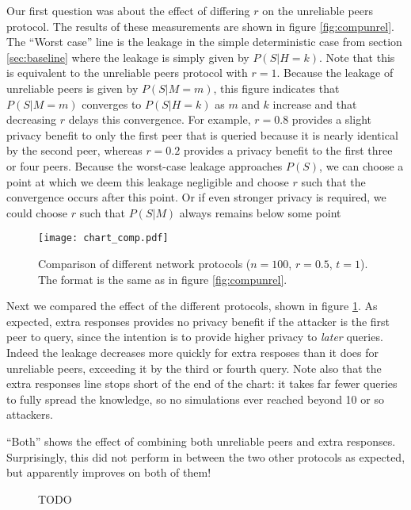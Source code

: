 \documentclass{article}
\newcommand{\secref}[1]{section \ref{sec:#1}}
\newcommand{\figref}[1]{figure \ref{fig:#1}}
\begin{document}
Our first question was about the effect of differing $r$ on the unreliable peers
protocol. The results of these measurements are shown in \figref{compunrel}.
The ``Worst case'' line is the leakage in the simple deterministic case from
\secref{baseline} where the leakage is simply given by $P(S|H=k)$. Note that
this is equivalent to the unreliable peers protocol with $r=1$. Because the
leakage of unreliable peers is given by $P(S|M=m)$, this figure
indicates that $P(S|M=m)$ converges to $P(S|H=k)$ as $m$ and $k$ increase and
that decreasing $r$ delays this convergence. For example, $r=0.8$ provides a
slight privacy benefit to only the first peer that is queried because it is nearly identical
by the second peer, whereas $r=0.2$ provides a privacy benefit to the first
three or four peers. Because the worst-case leakage approaches $P(S)$, we can
choose a point at which we deem this leakage negligible and choose $r$ such that
the convergence occurs after this point. Or if even stronger privacy is
required, we could choose $r$ such that $P(S|M)$ always remains below some point


\begin{figure}%
    \centering
	\texttt{[image: chart\_comp.pdf]}
	\caption{Comparison of different network protocols ($n=100$, $r=0.5$, $t=1$).
	The format is the same as in \figref{compunrel}.}
    \label{fig:comp}%
\end{figure}

Next we compared the effect of the different protocols, shown in \figref{comp}.
As expected, extra responses provides no privacy benefit if the attacker is the
first peer to query, since the intention is to provide higher privacy to {\it
later} queries. Indeed the leakage decreases more quickly for extra
resposes than it does for unreliable peers, exceeding it by the third or fourth
query. Note also that the extra responses line stops short of the end of the
chart: it takes far fewer queries to fully spread the knowledge, so no
simulations ever reached beyond 10 or so attackers.

``Both'' shows the effect of combining both unreliable peers and extra
responses. Surprisingly, this did not perform in between the two other protocols
as expected, but apparently improves on both of them!

\begin{figure}%
    \centering
	\caption{TODO}
    \label{fig:exdist}%
\end{figure}
\end{document}
